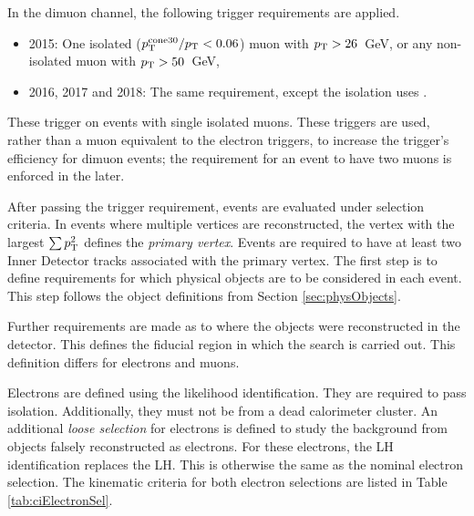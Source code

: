 In the dimuon channel, the following trigger requirements are applied.
\begin{itemize}
	\item 2015: One isolated ($p_\text{T}^\text{cone30}/p_\text{T}<0.06$) muon with $p_\text{T}>26$~GeV, or any non-isolated muon with $p_\text{T}>50$~GeV,
	\item 2016, 2017 and 2018: The same requirement, except the isolation uses \ptvarconeMuon.
\end{itemize}
These trigger on events with single isolated muons.
These triggers are used, rather than a muon equivalent to the electron triggers, to increase the trigger's efficiency for dimuon events; the requirement for an event to have two muons is enforced in the later.

After passing the trigger requirement, events are evaluated under selection criteria.
In events where multiple vertices are reconstructed, the vertex with the largest $\sum p_\text{T}^2$ defines the \emph{primary vertex}.
Events are required to have at least two Inner Detector tracks associated with the primary vertex.
The first step is to define requirements for which physical objects are to be considered in each event. This step follows the object definitions from Section \ref{sec:physObjects}.

Further requirements are made as to where the objects were reconstructed in the detector. 
This defines the fiducial region in which the search is carried out.
This definition differs for electrons and muons.

Electrons are defined using the  likelihood identification.
They are required to pass  isolation.
Additionally, they must not be from a dead calorimeter cluster.
An additional \emph{loose selection} for electrons is defined to study the background from objects falsely reconstructed as electrons.
For these electrons, the  LH identification replaces the  LH.
This is otherwise the same as the nominal electron selection.
The kinematic criteria for both electron selections are listed in Table \ref{tab:ciElectronSel}.

